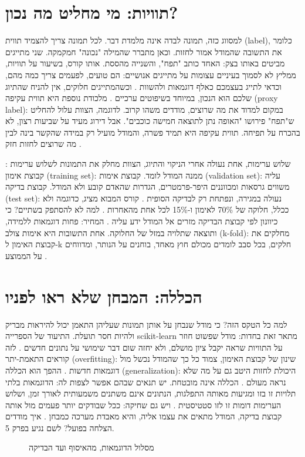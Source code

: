 \section{תוויות: מי מחליט מה נכון?}
למסווג כזה, תמונה לבדה אינה מלמדת דבר. לכל תמונה צריך להצמיד תווית (label), כלומר את התשובה שהמודל אמור לחזות. וכאן מתברר שהמילה "נכונה" חמקמקה. שני מתייגים מביטים באותו בצק: האחד כותב "תפח", והשנייה מהססת.
אותו קורס, בשיעור על תוויות, ממליץ לא לסמוך בעיניים עצומות על מתייגים אנושיים: הם טועים, לפעמים צריך כמה מהם, וכדאי לתייג בעצמכם כאלף דוגמאות ולהשוות \cite{S-ch02-12}. וכשהמתייגים חלוקים, אין להניח שהתיוג שלכם הוא הנכון, במיוחד בשיפוטים ערכיים \cite{S-ch02-12}.
מלכודת נוספת היא תווית עקיפה (proxy label): במקום למדוד את מה שרוצים, מודדים משהו קרוב. לדוגמה, הצוות עלול להחליט ש"תפח" פירושו "האופה נתן לתוצאה חמישה כוכבים". אבל דירוג מעיד על שביעות רצון, לא בהכרח על תפיחה. תווית עקיפה היא תמיד פשרה, והמודל מועיל רק במידה שהקשר בינה לבין מה שרוצים לחזות חזק \cite{S-ch02-12}.
\begin{behindbox}{שלוש ערימות, אחת נעולה}
אחרי הניקוי והתיוג, הצוות מחלק את התמונות לשלוש ערימות \cite{S-ch02-10}:
קבוצת אימון (training set): ממנה המודל לומד.
קבוצת אימות (validation set): עליה משווים גרסאות ומכווננים היפר-פרמטרים, הגדרות שהאדם קובע ולא המודל.
קבוצת בדיקה (test set): נעולה במגירה, ונפתחת רק לבדיקה הסופית \cite{S-ch02-09}.
קורס המבוא מציג, כדוגמה ולא ככלל, חלוקה של 70\% לאימון ו-15\% לכל אחת מהאחרות \cite{S-ch02-10}. למה לא להסתפק בשתיים? כי כיוונון לפי קבוצת הבדיקה מזרים אל המודל ידע עליה \cite{S-ch02-09}. המחיר: פחות דוגמאות ללמידה, ותוצאה שתלויה במזל של החלוקה. אחת התשובות היא אימות צולב (k-fold): מחלקים את קבוצת האימון ל-k חלקים, בכל סבב לומדים מכולם חוץ מאחד, בוחנים על הנותר, ומדווחים על הממוצע \cite{S-ch02-09}.
\end{behindbox}
\section{הכללה: המבחן שלא ראו לפניו}
למה כל הטקס הזה? כי מודל שנבחן על אותן תמונות שעליהן התאמן יכול להיראות מבריק ולהיות חסר תועלת. התיעוד של הספרייה scikit-learn מתאר זאת בחדות: מודל שפשוט חוזר על התוויות שראה יקבל ציון מושלם, ולא יחזה שום דבר שימושי על נתונים חדשים \cite{S-ch02-09}. לזה קוראים התאמת-יתר (overfitting): שינון של קבוצת האימון, צמוד כל כך שהמודל נכשל מול דוגמאות חדשות \cite{S-ch02-11}. ההפך הוא הכללה (generalization): היכולת לחזות היטב גם על מה שלא נראה מעולם \cite{S-ch02-11}.
הכללה אינה מובטחת. יש תנאים שבהם אפשר לצפות לה: הדוגמאות בלתי תלויות זו בזו ומגיעות מאותה התפלגות, הנתונים אינם משתנים משמעותית לאורך זמן, ושלוש הערימות דומות זו לזו סטטיסטית \cite{S-ch02-11}. ויש גם שחיקה: ככל שבודקים יותר פעמים מול אותה קבוצת בדיקה, המודל מתאים את עצמו אליה, והיא מאבדת מערכה כמבחן \cite{S-ch02-10}. איך מודדים הצלחה בפועל? לשם נגיע בפרק 5.
\begin{figure}[htbp]
\centering

\caption{מסלול הדוגמאות, מהאיסוף ועד הבדיקה}\label{fig:2.1}
\end{figure}
